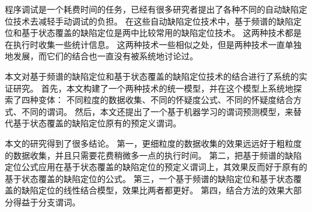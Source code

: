 
\begin{cabstract}

程序调试是一个耗费时间的任务，已经有很多研究者提出了各种不同的自动缺陷定位技术去减轻手动调试的负担。
在这些自动缺陷定位技术中，基于频谱的缺陷定位和基于状态覆盖的缺陷定位是两中比较常用的缺陷定位技术。
这两种技术都是在执行时收集一些统计信息。
这两种技术一些相似之处，但是两种技术一直单独地发展，而它们的结合也一直没有被系统地讨论过。

本文对基于频谱的缺陷定位和基于状态覆盖的缺陷定位技术的结合进行了系统的实证研究。
首先，本文构建了一个两种技术的统一模型，并在这个模型上系统地探索了四种变体：
不同粒度的数据收集、不同的怀疑度公式、不同的怀疑度结合方式、不同的谓词。
然后，本文还提出了一个基于机器学习的谓词预测模型，来替代基于状态覆盖的缺陷定位原有的预定义谓词。

本文的研究得到了很多结论。
第一，更细粒度的数据收集的效果远远好于粗粒度的数据收集，并且只需要花费稍微多一点的执行时间。
第二，把基于频谱的缺陷定位公式应用在基于状态覆盖的缺陷定位的预定义谓词上，其效果反而好于原有的基于状态覆盖的缺陷定位的公式。
第三，一个基于频谱的缺陷定位和基于状态覆盖的缺陷定位的线性结合模型，效果比两者都更好。
第四，结合方法的效果大部分得益于分支谓词。

\end{cabstract}

